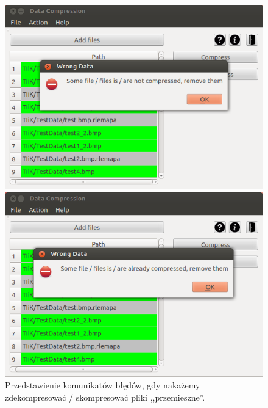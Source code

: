 \documentclass[12pt,a4paper,notitlepage]{report}
\begin{document}
\begin{figure}[H]
	\caption{Przedstawienie komunikatów błędów, gdy nakażemy zdekompresować / skompresować pliki ,,przemieszne''.}
	\centering
	\begin{minipage}{0.45\textwidth}
		\centering
		\includegraphics[scale=.4]{error1}
	\end{minipage}\hfill
	\begin{minipage}{0.45\textwidth}
		\centering
		\includegraphics[scale=.4]{error2}
	\end{minipage}
\end{figure}
\end{document}
